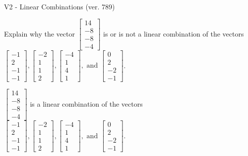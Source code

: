 \begin{exercise}
  \begin{exerciseTitle}V2 - Linear Combinations (ver. 789)\end{exerciseTitle}
  \begin{exerciseStatement}
    Explain why the vector \(\left[\begin{array}{c}
14 \\
-8 \\
-8 \\
-4
\end{array}\right]\)  is or is not a linear 
	combination of the vectors \(\left[\begin{array}{c}
-1 \\
2 \\
-1 \\
-1
\end{array}\right] , \left[\begin{array}{c}
-2 \\
1 \\
1 \\
2
\end{array}\right] , \left[\begin{array}{c}
-4 \\
1 \\
4 \\
1
\end{array}\right] , \text{ and } \left[\begin{array}{c}
0 \\
2 \\
-2 \\
-1
\end{array}\right]\).
	


  \end{exerciseStatement}
  \begin{exerciseAnswer}
   \(\left[\begin{array}{c}
14 \\
-8 \\
-8 \\
-4
\end{array}\right]\) 
  	 is  
	a linear combination of the vectors \(\left[\begin{array}{c}
-1 \\
2 \\
-1 \\
-1
\end{array}\right] , \left[\begin{array}{c}
-2 \\
1 \\
1 \\
2
\end{array}\right] , \left[\begin{array}{c}
-4 \\
1 \\
4 \\
1
\end{array}\right] , \text{ and } \left[\begin{array}{c}
0 \\
2 \\
-2 \\
-1
\end{array}\right]\).


\end{exerciseAnswer}
\end{exercise}
